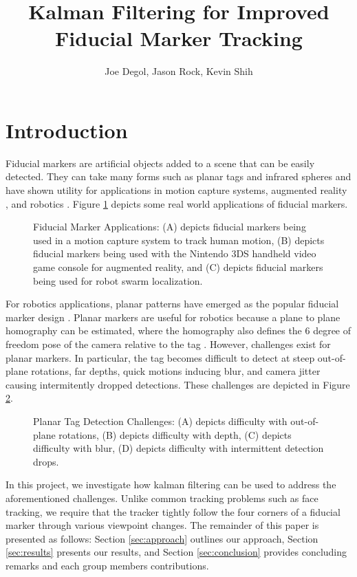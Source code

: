\documentclass[12pt]{article}
\title{Kalman Filtering for Improved Fiducial Marker Tracking}
\author{Joe Degol, Jason Rock, Kevin Shih}
\begin{document}
\maketitle

\section{Introduction}
Fiducial markers are artificial objects added to a scene that can be easily detected. They can take many forms such as planar tags and infrared spheres and have shown utility for applications in motion capture systems, augmented reality \cite{Fiala2005,Fiala2010}, and robotics \cite{Olson2011}. Figure \ref{fig:applications} depicts some real world applications of fiducial markers.

\begin{figure}[h]
\centering
\caption{Fiducial Marker Applications: (A) depicts fiducial markers being used in a motion capture system to track human motion, (B) depicts fiducial markers being used with the Nintendo 3DS handheld video game console for augmented reality, and (C) depicts fiducial markers being used for robot swarm localization.}
\label{fig:applications}
\end{figure}

For robotics applications, planar patterns have emerged as the popular fiducial marker design \cite{Sattar2007,Olson2011}. Planar markers are useful for robotics because a plane to plane homography can be estimated, where the homography also defines the 6 degree of freedom pose of the camera relative to the tag \cite{Olson2011}. However, challenges exist for planar markers. In particular, the tag becomes difficult to detect at steep out-of-plane rotations, far depths, quick motions inducing blur, and camera jitter causing intermitently dropped detections. These challenges are depicted in Figure \ref{fig:challenges}.

\begin{figure}[h]
\centering
\caption{Planar Tag Detection Challenges: (A) depicts difficulty with out-of-plane rotations, (B) depicts difficulty with depth, (C) depicts difficulty with blur, (D) depicts difficulty with intermittent detection drops.}
\label{fig:challenges}
\end{figure}

In this project, we investigate how kalman filtering can be used to address the aforementioned challenges. Unlike common tracking problems such as face tracking, we require that the tracker tightly follow the four corners of a fiducial marker through various viewpoint changes. The remainder of this paper is presented as follows: Section \ref{sec:approach} outlines our approach, Section \ref{sec:results} presents our results, and Section \ref{sec:conclusion} provides concluding remarks and each group members contributions.
\end{document}
